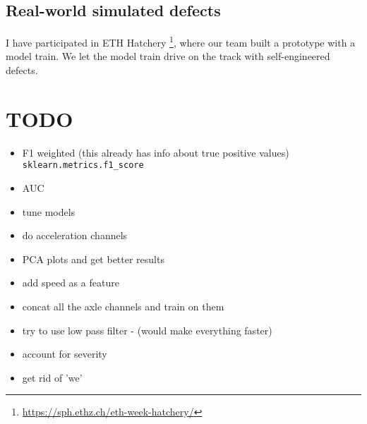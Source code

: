 \subsection{Real-world simulated defects}
I have participated in ETH Hatchery \footnote{\url{https://sph.ethz.ch/eth-week-hatchery/}}, where our team built a prototype with a model train. We let the model train drive on the track with self-engineered defects. 


\newpage
\section{TODO}
\begin{itemize}
	\item F1 weighted (this already has info about true positive values) \verb|sklearn.metrics.f1_score|
	\item AUC
	\item tune models
	\item do acceleration channels
	\item PCA plots and get better results
	\item add speed as a feature
	\item concat all the axle channels and train on them
	\item try to use low pass filter - (would make everything faster)
	\item account for severity
	\item get rid of 'we'
\end{itemize}



\newpage
\cleardoublepage
\appendix
